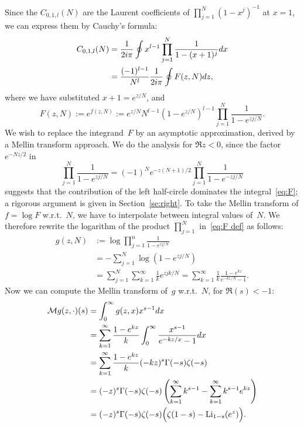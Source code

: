 \documentclass[a4paper]{amsart}
\begin{document}
Since the $C_{0,1,l}(N)$ are the Laurent coefficients of
$\prod_{j=1}^N (1-x^j)^{-1}$ at $x=1$, we
can express them by Cauchy's formula:
\begin{align}
   C_{0,1,l}(N) &= \frac{1}{2i\pi} \oint x^{l-1} \prod_{j=1}^N \frac{1}{1-(x+1)^j}dx \notag \\
   & =  \frac{(-1)^{l-1}}{N^l} \frac{1}{2i\pi} \oint F(z,N) dz, \label{eq:F}
\end{align}
where we have substituted $x+1=e^{z/N}$, and
\begin{equation}\label{eq:F def}
  F(z,N) := e^{f(z,N)} := e^{z/N}N^{l-1}(1-e^{z/N})^{l-1}\prod_{j=1}^N \frac{1}{1-e^{zj/N}}.
\end{equation}
We wish to replace the integrand~$F$ by an asymptotic approximation, 
derived by a Mellin transform approach.
We do the analysis for $\Re z<0$, since the factor~$e^{-Nz/2}$ in
\begin{equation}\label{eq:refl}
  \prod_{j=1}^N \frac 1{1-e^{zj/N}} 
  = (-1)^N e^{-z(N+1)/2} \prod_{j=1}^N \frac 1{1-e^{-zj/N}}
\end{equation}
suggests that the contribution of the left half-circle dominates
the integral~\eqref{eq:F}; a rigorous argument is given in Section~\ref{se:right}.
To take the Mellin transform of $f=\log F$ w.r.t.~$N$, we have to interpolate between integral values of~$N$. We therefore rewrite the
logarithm of the product $\prod_{j=1}^N$ in~\eqref{eq:F def} as follows:
\begin{align*}
 g(z,N)  &:= \log \prod_{j=1}^n  \frac{1}{1-e^{zj/N}} \\ 
 &= - \sum_{j=1}^N \log(1-e^{zj/N}) \\
  &= \sum_{j=1}^N \sum_{k=1}^\infty \frac{1}{k}e^{zjk/N} 
 = \sum_{k=1}^\infty \frac{1}{k} \frac{1-e^{kz}}{e^{-kz/N}-1}.
\end{align*}
Now we can compute the Mellin transform of~$g$ w.r.t.~$N$, for $\Re(s)<-1$:
\begin{align}
 \mathcal{M}g(z,\cdot)(s)&=\int_0^\infty g(z,x)x^{s-1}dx \notag \\
&=  \sum_{k=1}^\infty \frac{1-e^{kz}}{k}
    \int_0^\infty \frac{x^{s-1}}{e^{-kz/x}-1} dx \notag \\
  &= \sum_{k=1}^\infty  \frac{1-e^{kz}}{k} (-kz)^s \Gamma(-s)\zeta(-s) \notag \\
  &= (-z)^s \Gamma(-s)\zeta(-s) \left(\sum_{k=1}^\infty k^{s-1}
  - \sum_{k=1}^\infty  k^{s-1} e^{kz}  \right) \notag \\
  &= (-z)^s \Gamma(-s)\zeta(-s) \Big(\zeta(1-s) - \mathrm{Li}_{1-s}(e^z)\Big).
  \label{eq:mellin}
\end{align}
\end{document}
